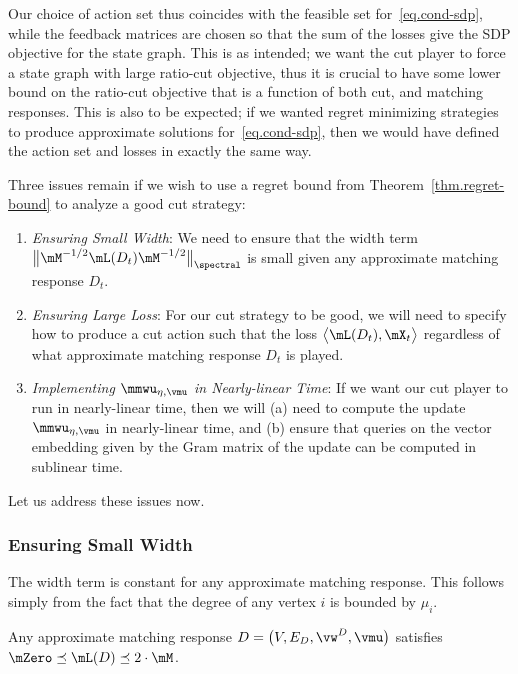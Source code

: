 \documentclass[letterpaper]{article}
\begin{document}
\noindent
Our choice of action set thus coincides with the feasible set for~\eqref{eq.cond-sdp}, while the feedback matrices are chosen so that the sum of the losses give the SDP objective for the state graph. This is as intended; we want the cut player to force a state graph with large ratio-cut objective, thus it is crucial to have some lower bound on the ratio-cut objective that is a function of both cut, and matching responses. This is also to be expected; if we wanted regret minimizing strategies to produce approximate solutions for~\eqref{eq.cond-sdp}, then we would have defined the action set and losses in exactly the same way.

Three issues remain if we wish to use a regret bound from Theorem~\ref{thm.regret-bound} to analyze a good cut strategy:
\begin{enumerate}[(1)]
\item \emph{Ensuring Small Width}: We need to ensure that the width term $\big\lVert \mM^{-1/2} \mL(D_t) \mM^{-1/2} \big\rVert_{\spectral}$ is small given any approximate matching response $D_t$.

\item \emph{Ensuring Large Loss}: For our cut strategy to be good, we will need to specify how to produce a cut action such that the loss $\big\langle \mL(D_t), \mX_t \big\rangle$ regardless of what approximate matching response $D_t$ is played.

\item \emph{Implementing $\mmwu_{\eta, \vmu}$ in Nearly-linear Time}: If we want our cut player to run in nearly-linear time, then we will (a) need to compute the update $\mmwu_{\eta, \vmu}$ in nearly-linear time, and (b) ensure that queries on the vector embedding given by the Gram matrix of the update can be computed in sublinear time.
\end{enumerate}
\noindent
Let us address these issues now.


\subsubsection{Ensuring Small Width}
The width term is constant for any approximate matching response. This follows simply from the fact that the degree of any vertex $i$ is bounded by $\mu_i$.

\begin{lemma}
\label{lem.sym-cut-strat.width}
Any approximate matching response $D = \big( V, E_D, \vw^D, \vmu \big)$ satisfies $\mZero \preceq \mL(D) \preceq 2 \cdot \mM$.
\end{lemma}
\end{document}
